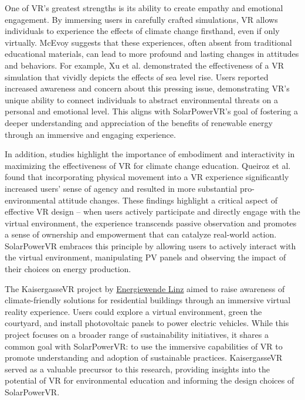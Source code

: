 \documentclass[draft, final]{vutinfth} %
\begin{document}
One of VR's greatest strengths is its ability to create empathy and emotional engagement. By immersing users in carefully crafted simulations, VR allows individuals to experience the effects of climate change firsthand, even if only virtually. McEvoy \cite{McEvoy2023Climate} suggests that these experiences, often absent from traditional educational materials, can lead to more profound and lasting changes in attitudes and behaviors. For example, Xu et al. \cite{Xu2022Explore} demonstrated the effectiveness of a VR simulation that vividly depicts the effects of sea level rise.  Users reported increased awareness and concern about this pressing issue, demonstrating VR's unique ability to connect individuals to abstract environmental threats on a personal and emotional level. This aligns with SolarPowerVR's goal of fostering a deeper understanding and appreciation of the benefits of renewable energy through an immersive and engaging experience.

In addition, studies highlight the importance of embodiment and interactivity in maximizing the effectiveness of VR for climate change education. Queiroz et al. \cite{Queiroz2023Efficacy} found that incorporating physical movement into a VR experience significantly increased users' sense of agency and resulted in more substantial pro-environmental attitude changes. These findings highlight a critical aspect of effective VR design -- when users actively participate and directly engage with the virtual environment, the experience transcends passive observation and promotes a sense of ownership and empowerment that can catalyze real-world action. SolarPowerVR embraces this principle by allowing users to actively interact with the virtual environment, manipulating PV panels and observing the impact of their choices on energy production.

The KaisergasseVR project by \href{https://www.energiewende-linz.at}{Energiewende Linz} aimed to raise awareness of climate-friendly solutions for residential buildings through an immersive virtual reality experience. Users could explore a virtual environment, green the courtyard, and install photovoltaic panels to power electric vehicles. While this project focuses on a broader range of sustainability initiatives, it shares a common goal with SolarPowerVR: to use the immersive capabilities of VR to promote understanding and adoption of sustainable practices. KaisergasseVR served as a valuable precursor to this research, providing insights into the potential of VR for environmental education and informing the design choices of SolarPowerVR.
\end{document}
